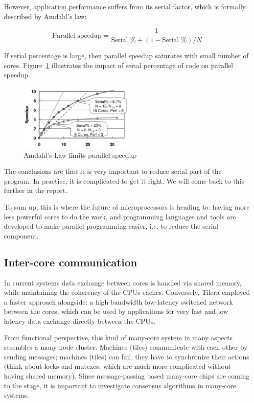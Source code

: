 \documentclass[english,11pt]{l4proj}
\begin{document}
However, application performance suffers from its serial factor, which is
formally described by Amdahl's law:

$$
\text{Parallel speedup} =
\frac{1}{\text{Serial \%} + (1 - \text{Serial \%}) / N}
$$

If serial percentage is large, then parallel speedup saturates with small number
of cores. Figure~\ref{fig:amdahl} illustrates the impact of serial
percentage of code on parallel speedup.

\begin{figure}[h]
    \centering
    \includegraphics[width=0.5\textwidth]{images/amdahl.png}
    \caption{Amdahl's Law limits parallel speedup}
    \label{fig:amdahl}
\end{figure}

The conclusions are that it is very important to reduce serial part of the
program. In practice, it is complicated to get it right. We will come back to
this further in the report.

To sum up, this is where the future of microprocessors is heading to: having
more less powerful cores to do the work\cite{future-microprocessors}, and
programming languages and tools are developed to make parallel programming
easier, i.e. to reduce the serial component.

\subsection{Inter-core communication}

In current systems data exchange between cores is handled via shared memory,
while maintaining the coherency of the CPUs caches. Conversely, Tilera employed
a faster approach alongside: a high-bandwidth low-latency switched network
between the cores, which can be used by applications for very fast and low
latency data exchange directly between the CPUs\cite{tile64}.

From functional perspective, this kind of many-core system in many aspects
resembles a many-node cluster. Machines (tiles) communicate with each other by
sending messages; machines (tiles) can fail; they have to synchronize their
actions (think about locks and mutexes, which are much more complicated without
having shared memory). Since message-passing based many-core chips are coming to
the stage, it is important to investigate consensus algorithms in many-core
systems.
\end{document}
